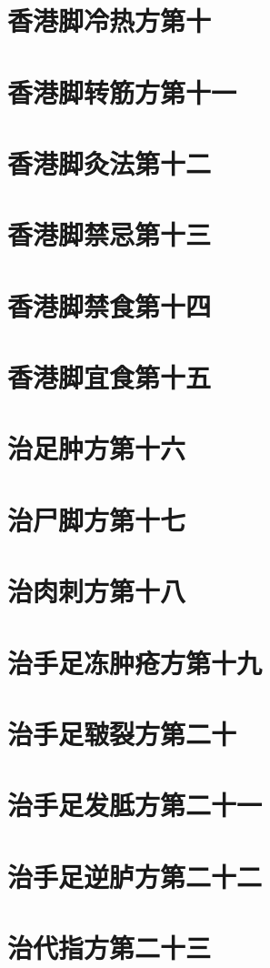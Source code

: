 \documentclass[a4paper,12pt,UTF8,twoside]{ctexbook}
\begin{document}
\chapter{香港脚冷热方第十}
\chapter{香港脚转筋方第十一}
\chapter{香港脚灸法第十二}
\chapter{香港脚禁忌第十三}
\chapter{香港脚禁食第十四}
\chapter{香港脚宜食第十五}
\chapter{治足肿方第十六}
\chapter{治尸脚方第十七}
\chapter{治肉刺方第十八}
\chapter{治手足冻肿疮方第十九}
\chapter{治手足皲裂方第二十}
\chapter{治手足发胝方第二十一}
\chapter{治手足逆胪方第二十二}
\chapter{治代指方第二十三}
\end{document}

